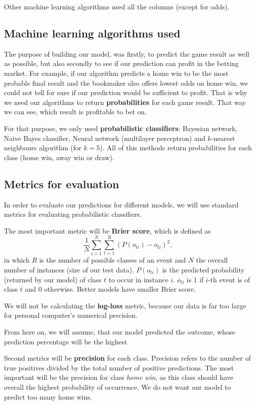 \documentclass[conference]{IEEEtran}
\begin{document}
Other machine learning algorithms used all the columns (except for odds).

\subsection{Machine learning algorithms used}

The purpose of building our model, was firstly, to predict the game result as well as possible,
but also secondly to see if our prediction can profit in the betting market. For example,
if our algorithm predicts a home win to be the most probable final result and the bookmaker
also offers lowest odds on home win, we could not tell for sure if our prediction would be
sufficient to profit. That is why we need our algorithms to return \textbf{probabilities} for
each game result. That way we can see, which result is profitable to bet on.

For that purpose, we only used \textbf{probabilistic classifiers}: Bayesian network, Naive
Bayes classifier, Neural network (multilayer perceptron) and $k$-nearest neighbours algorithm 
(for $k=5$). All of this methods return probabilities for each class (home win, away win or draw).

\subsection{Metrics for evaluation}

In order to evaluate our predictions for different models, we will use standard metrics for 
evaluating probabilistic classifiers. 

The most important metric will be \textbf{Brier score}, which is defined as 
$$\frac{1}{N} \sum_{i=1}^{N} \sum_{t=1}^{R} {(P(o_{ti}) - o_{ti})^2},$$ in which $R$ is the
number of possible classes of an event and $N$ the overall number of instances (size of our
test data). $P(o_{ti})$ is the predicted probability (returned by our model) of class $t$ 
to occur in instance $i$. $o_{ti}$ is 1 if $i$-th event is of class $t$ and 0 otherwise. 
Better models have smaller 
Brier score.

We will not be calculating the \textbf{log-loss} metric, because our data is far too large 
for personal computer's numerical precision.

From here on, we will assume, that our model predicted the outcome, whose prediction 
percentage will be the highest. 

Second metrics will be \textbf{precision} for each class. Precision refers to the number of 
true positives divided by the total number of positive predictions. The most important will 
be the precision for class \textit{home win}, as this class should have overall the highest 
probability of occurrence. We do not want our model to predict too many home wins.
\end{document}
